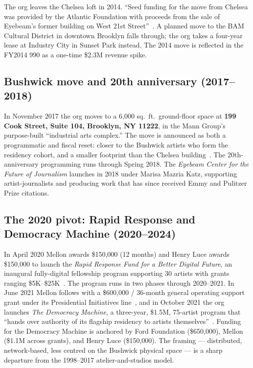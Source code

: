 \documentclass[10pt,letterpaper,twocolumn]{article}
\begin{document}
The org leaves the Chelsea loft in 2014. ``Seed funding for the move from Chelsea was provided by the Atlantic Foundation with proceeds from the sale of Eyebeam's former building on West 21st Street''~\citep{technically2014sunsetpark}. A planned move to the BAM Cultural District in downtown Brooklyn falls through; the org takes a four-year lease at Industry City in Sunset Park instead. The 2014 move is reflected in the FY2014 990 as a one-time \$2.3M revenue spike.

\subsection{Bushwick move and 20th anniversary (2017--2018)}

In November 2017 the org moves to a 6,000 sq.~ft.~ground-floor space at \textbf{199 Cook Street, Suite 104, Brooklyn, NY 11222}, in the Mann Group's purpose-built ``industrial arts complex.'' The move is announced as both a programmatic and fiscal reset: closer to the Bushwick artists who form the residency cohort, and a smaller footprint than the Chelsea building~\citep{hyperallergic2017bushwick}. The 20th-anniversary programming runs through Spring 2018. The \emph{Eyebeam Center for the Future of Journalism} launches in 2018 under Marisa Mazria Katz, supporting artist-journalists and producing work that has since received Emmy and Pulitzer Prize citations.

\subsection{The 2020 pivot: Rapid Response and Democracy Machine (2020--2024)}

In April 2020 Mellon awards \$150{,}000 (12 months) and Henry Luce awards \$150{,}000 to launch the \emph{Rapid Response Fund for a Better Digital Future}, an inaugural fully-digital fellowship program supporting 30 artists with grants ranging \$5K--\$25K~\citep{mellon2020rapidresponse,luce2020covid}. The program runs in two phases through 2020--2021. In June 2021 Mellon follows with a \$600{,}000 / 36-month general operating support grant under its Presidential Initiatives line~\citep{mellon2021genop}, and in October 2021 the org launches \emph{The Democracy Machine}, a three-year, \$1.5M, 75-artist program that ``hands over authority of its flagship residency to artists themselves''~\citep{eyebeam2021democracymachine,artnet2021dm}. Funding for the Democracy Machine is anchored by Ford Foundation (\$650{,}000), Mellon (\$1.1M across grants), and Henry Luce (\$150{,}000). The framing --- distributed, network-based, less centred on the Bushwick physical space --- is a sharp departure from the 1998--2017 atelier-and-studios model.
\end{document}

